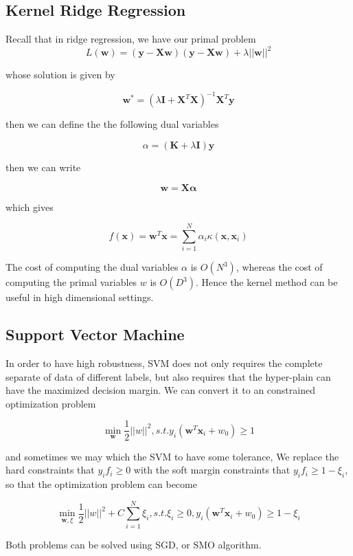 \documentclass[10pt,twocolumn,letterpaper]{article}
\begin{document}
	\subsection{Kernel Ridge Regression}
		Recall that in ridge regression, we have our primal problem
		\[L(\mathbf{w}) = (\mathbf{y} - \mathbf{X}\mathbf{w})(\mathbf{y} - \mathbf{X}\mathbf{w}) + \lambda ||\mathbf{w}||^2\]
		
		whose solution is given by 
		
		\[\mathbf{w}^* = (\lambda\mathbf{I} + \mathbf{X}^T\mathbf{X})^{-1}\mathbf{X}^T\mathbf{y}\]
		
		then we can define the the following dual variables
		
		\[\alpha = (\mathbf{K} + \lambda\mathbf{I})\mathbf{y}\]
		
		then we can write
		
		\[\mathbf{w} = \mathbf{X}\mathbf{\alpha}\]
		
		which gives
		
		\[f(\mathbf{x}) = \mathbf{w}^T\mathbf{x} = \sum_{i = 1}^N \alpha_i \kappa(\mathbf{x}, \mathbf{x}_i)\]
		
		The cost of computing the dual variables $\alpha$ is $O(N^3)$, whereas the cost of computing the primal variables $w$ is $O(D^3)$. Hence the kernel method can be useful in high dimensional settings\cite{murphy_2013}. 
		
	\subsection{Support Vector Machine}
	In order to have high robustness, SVM does not only requires the complete separate of data of different labels, but also requires that the hyper-plain can have the maximized decision margin\cite{murphy_2013}. We can convert it to an constrained optimization problem
	
	\[\min_{\mathbf{w}} \frac{1}{2} ||w||^2, s.t. y_i(\mathbf{w}^T\mathbf{x}_i + w_0) \geq 1\]
	
	and sometimes we may which the SVM to have some tolerance, We replace the hard constraints that $y_if_i \geq 0$ with the soft margin constraints that $y_if_i \geq 1 − \xi_i$, so that the optimization problem can become 
	
	\[\min_{\mathbf{w}, \xi} \frac{1}{2} ||w||^2 + C\sum_{i = 1}^N \xi_i, s.t. \xi_i \geq 0, y_i(\mathbf{w}^T\mathbf{x}_i + w_0) \geq 1 - \xi_i\]
	
	Both problems can be solved using SGD, or SMO algorithm\cite{platt1998sequential}.
\end{document}
